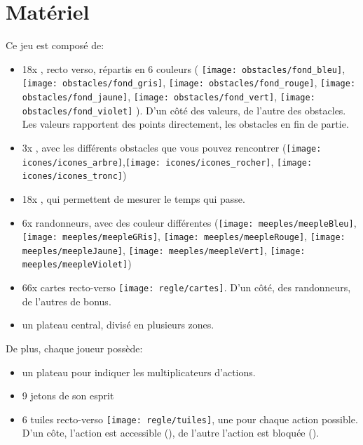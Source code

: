 \section*{Matériel} \label{sec:Matériel}

Ce jeu est composé de:
\begin{itemize}
\item 18x \jetonsObstacles, recto verso, répartis en 6 couleurs ( \texttt{[image: obstacles/fond\_bleu]}, 
\texttt{[image: obstacles/fond\_gris]}, \texttt{[image: obstacles/fond\_rouge]}, \texttt{[image: obstacles/fond\_jaune]}, \texttt{[image: obstacles/fond\_vert]}, \texttt{[image: obstacles/fond\_violet]} ). D'un côté des valeurs, de l'autre des obstacles. Les valeurs rapportent des points directement, les obstacles en fin de partie.
\item 3x \marqueursObstacles, avec les différents obstacles que vous pouvez rencontrer (\texttt{[image: icones/icones\_arbre]},\texttt{[image: icones/icones\_rocher]}, \texttt{[image: icones/icones\_tronc]})
\item 18x \jetonsMeteo, qui permettent de mesurer le temps qui passe.
\item 6x randonneurs, avec des couleur différentes (\texttt{[image: meeples/meepleBleu]}, \texttt{[image: meeples/meepleGRis]}, \texttt{[image: meeples/meepleRouge]}, \texttt{[image: meeples/meepleJaune]}, \texttt{[image: meeples/meepleVert]}, \texttt{[image: meeples/meepleViolet]})
\item 66x cartes recto-verso \texttt{[image: regle/cartes]}. D'un côté, des randonneurs, de l'autres de bonus.
\item un plateau central, divisé en plusieurs zones.
\end{itemize}

De plus, chaque joueur possède:
\begin{itemize}
\item un plateau pour indiquer les multiplicateurs d'actions.
\item 9 jetons de son esprit
\item 6 tuiles recto-verso \texttt{[image: regle/tuiles]}, une pour chaque action possible. D'un côte, l'action est accessible (\tuileActive), de l'autre l'action est bloquée (\tuileBloquee).
\end{itemize}
\FloatBarrier
